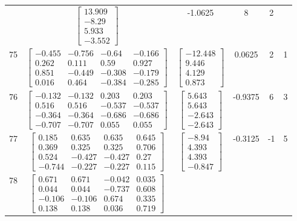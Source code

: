\documentclass[a4paper,12pt]{article}
\begin{document}
\begin{tabular}{c c c c c c}
&
$\begin{bmatrix} 13.909 \\ -8.29 \\ 5.933 \\ -3.552 \end{bmatrix}$
&
-1.0625
&
8
&
2
\\
75
&
$\begin{bmatrix} -0.455 & -0.756 & -0.64 & -0.166 \\ 0.262 & 0.111 & 0.59 & 0.927 \\ 0.851 & -0.449 & -0.308 & -0.179 \\ 0.016 & 0.464 & -0.384 & -0.285 \end{bmatrix}$
&
$\begin{bmatrix} -12.448 \\ 9.446 \\ 4.129 \\ 0.873 \end{bmatrix}$
&
0.0625
&
2
&
1
\\
76
&
$\begin{bmatrix} -0.132 & -0.132 & 0.203 & 0.203 \\ 0.516 & 0.516 & -0.537 & -0.537 \\ -0.364 & -0.364 & -0.686 & -0.686 \\ -0.707 & -0.707 & 0.055 & 0.055 \end{bmatrix}$
&
$\begin{bmatrix} 5.643 \\ 5.643 \\ -2.643 \\ -2.643 \end{bmatrix}$
&
-0.9375
&
6
&
3
\\
77
&
$\begin{bmatrix} 0.185 & 0.635 & 0.635 & 0.645 \\ 0.369 & 0.325 & 0.325 & 0.706 \\ 0.524 & -0.427 & -0.427 & 0.27 \\ -0.744 & -0.227 & -0.227 & 0.115 \end{bmatrix}$
&
$\begin{bmatrix} -8.94 \\ 4.393 \\ 4.393 \\ -0.847 \end{bmatrix}$
&
-0.3125
&
-1
&
5
\\
78
&
$\begin{bmatrix} 0.671 & 0.671 & -0.042 & 0.035 \\ 0.044 & 0.044 & -0.737 & 0.608 \\ -0.106 & -0.106 & 0.674 & 0.335 \\ 0.138 & 0.138 & 0.036 & 0.719 \end{bmatrix}$

\end{tabular}
\end{document}
